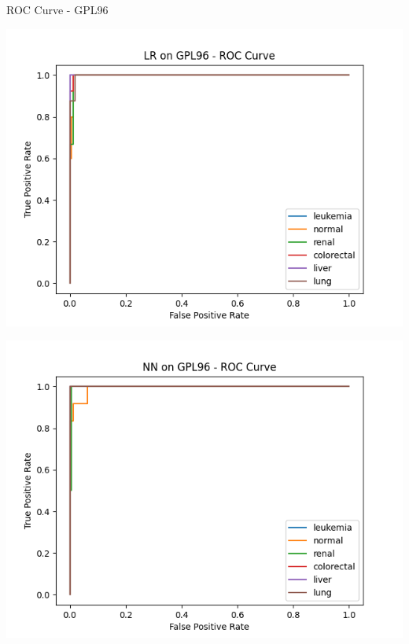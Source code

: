 \documentclass{beamer}
\begin{document}
    \iffalse %
    \begin{frame}{ROC Curve - GPL96}
        \begin{center}
            \hspace{-60pt}
            \begin{minipage}{0.4\textwidth}
                \includegraphics[scale=.4]{LRonGPL96ROC.png}
            \end{minipage}
            \hspace{40pt}
            \begin{minipage}{0.4\textwidth}
                \includegraphics[scale=.4]{NNonGPL96ROC.png}
            \end{minipage}
        \end{center}
    \end{frame}
\end{document}
